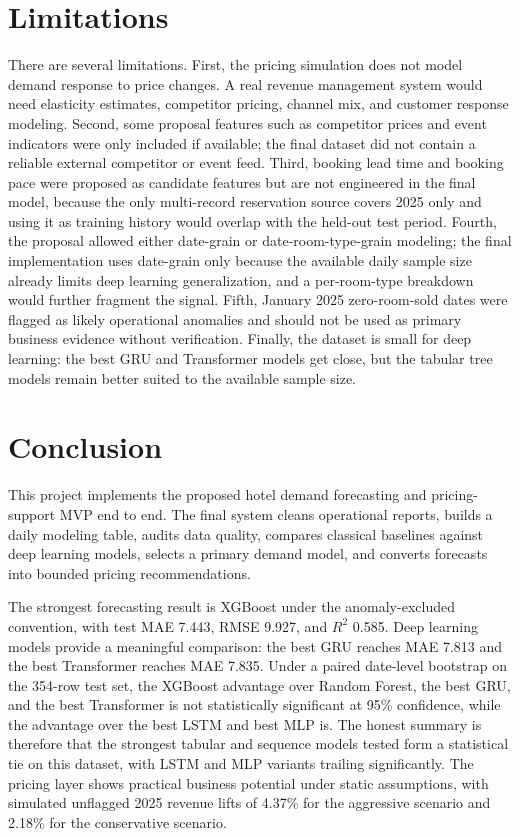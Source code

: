 \documentclass[conference]{IEEEtran}
\begin{document}
\section{Limitations}
There are several limitations. First, the pricing simulation does not model demand response to price changes. A real revenue management system would need elasticity estimates, competitor pricing, channel mix, and customer response modeling. Second, some proposal features such as competitor prices and event indicators were only included if available; the final dataset did not contain a reliable external competitor or event feed. Third, booking lead time and booking pace were proposed as candidate features but are not engineered in the final model, because the only multi-record reservation source covers 2025 only and using it as training history would overlap with the held-out test period. Fourth, the proposal allowed either date-grain or date-room-type-grain modeling; the final implementation uses date-grain only because the available daily sample size already limits deep learning generalization, and a per-room-type breakdown would further fragment the signal. Fifth, January 2025 zero-room-sold dates were flagged as likely operational anomalies and should not be used as primary business evidence without verification. Finally, the dataset is small for deep learning: the best GRU and Transformer models get close, but the tabular tree models remain better suited to the available sample size.

\section{Conclusion}
This project implements the proposed hotel demand forecasting and pricing-support MVP end to end. The final system cleans operational reports, builds a daily modeling table, audits data quality, compares classical baselines against deep learning models, selects a primary demand model, and converts forecasts into bounded pricing recommendations.

The strongest forecasting result is XGBoost under the anomaly-excluded convention, with test MAE 7.443, RMSE 9.927, and $R^2$ 0.585. Deep learning models provide a meaningful comparison: the best GRU reaches MAE 7.813 and the best Transformer reaches MAE 7.835. Under a paired date-level bootstrap on the 354-row test set, the XGBoost advantage over Random Forest, the best GRU, and the best Transformer is not statistically significant at 95\% confidence, while the advantage over the best LSTM and best MLP is. The honest summary is therefore that the strongest tabular and sequence models tested form a statistical tie on this dataset, with LSTM and MLP variants trailing significantly. The pricing layer shows practical business potential under static assumptions, with simulated unflagged 2025 revenue lifts of 4.37\% for the aggressive scenario and 2.18\% for the conservative scenario.
\end{document}
